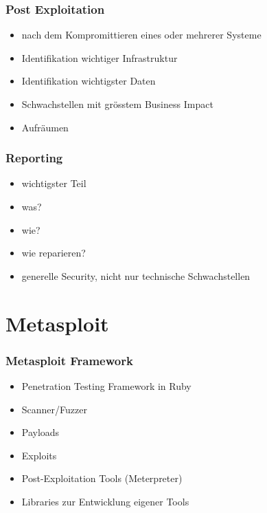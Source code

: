\documentclass[11pt]{beamer}
\begin{document}
\begin{frame}[fragile]\frametitle{Post Exploitation}
\label{sec-2-6}
\begin{itemize}

\item nach dem Kompromittieren eines oder mehrerer Systeme\\
\label{sec-2-6-1}%
\item Identifikation wichtiger Infrastruktur\\
\label{sec-2-6-2}%
\item Identifikation wichtigster Daten\\
\label{sec-2-6-3}%
\item Schwachstellen mit grösstem Business Impact\\
\label{sec-2-6-4}%
\item Aufräumen\\
\label{sec-2-6-5}%
\end{itemize} %
\end{frame}
\begin{frame}[fragile]\frametitle{Reporting}
\label{sec-2-7}
\begin{itemize}

\item wichtigster Teil\\
\label{sec-2-7-1}%
\item was?\\
\label{sec-2-7-2}%
\item wie?\\
\label{sec-2-7-3}%
\item wie reparieren?\\
\label{sec-2-7-4}%
\item generelle Security, nicht nur technische Schwachstellen\\
\label{sec-2-7-5}%
\end{itemize} %
\end{frame}
\section{Metasploit}
\label{sec-3}
\begin{frame}[fragile]\frametitle{Metasploit Framework}
\label{sec-3-1}
\begin{itemize}

\item Penetration Testing Framework in Ruby\\
\label{sec-3-1-1}%
\item Scanner/Fuzzer\\
\label{sec-3-1-2}%
\item Payloads\\
\label{sec-3-1-3}%
\item Exploits\\
\label{sec-3-1-4}%
\item Post-Exploitation Tools (Meterpreter)\\
\label{sec-3-1-5}%
\item Libraries zur Entwicklung eigener Tools\\
\label{sec-3-1-6}%
\end{itemize} %
\end{frame}
\end{document}
